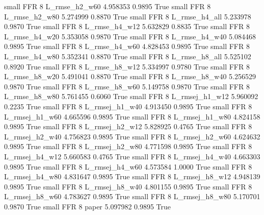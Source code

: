      small      FFR                 8  L_rmse_h2_w60   4.958353      0.9895    True
     small      FFR                 8  L_rmse_h2_w80   5.274999      0.8870    True
     small      FFR                 8  L_rmse_h4_all   5.233978      0.9870    True
     small      FFR                 8  L_rmse_h4_w12   5.632829      0.8835    True
     small      FFR                 8  L_rmse_h4_w20   5.353058      0.9870    True
     small      FFR                 8  L_rmse_h4_w40   5.084468      0.9895    True
     small      FFR                 8  L_rmse_h4_w60   4.828453      0.9895    True
     small      FFR                 8  L_rmse_h4_w80   5.352341      0.8870    True
     small      FFR                 8  L_rmse_h8_all   5.525102      0.8920    True
     small      FFR                 8  L_rmse_h8_w12   5.334997      0.9780    True
     small      FFR                 8  L_rmse_h8_w20   5.491041      0.8870    True
     small      FFR                 8  L_rmse_h8_w40   5.256529      0.9870    True
     small      FFR                 8  L_rmse_h8_w60   5.149758      0.9870    True
     small      FFR                 8  L_rmse_h8_w80   5.761455      0.6060    True
     small      FFR                 8 L_rmsej_h1_w12   5.960092      0.2235    True
     small      FFR                 8 L_rmsej_h1_w40   4.913450      0.9895    True
     small      FFR                 8 L_rmsej_h1_w60   4.665596      0.9895    True
     small      FFR                 8 L_rmsej_h1_w80   4.824158      0.9895    True
     small      FFR                 8 L_rmsej_h2_w12   5.828925      0.4765    True
     small      FFR                 8 L_rmsej_h2_w40   4.756823      0.9895    True
     small      FFR                 8 L_rmsej_h2_w60   4.624632      0.9895    True
     small      FFR                 8 L_rmsej_h2_w80   4.771598      0.9895    True
     small      FFR                 8 L_rmsej_h4_w12   5.660583      0.4765    True
     small      FFR                 8 L_rmsej_h4_w40   4.663303      0.9895    True
     small      FFR                 8 L_rmsej_h4_w60   4.573584      1.0000    True
     small      FFR                 8 L_rmsej_h4_w80   4.831647      0.9895    True
     small      FFR                 8 L_rmsej_h8_w12   4.948139      0.9895    True
     small      FFR                 8 L_rmsej_h8_w40   4.801155      0.9895    True
     small      FFR                 8 L_rmsej_h8_w60   4.783627      0.9895    True
     small      FFR                 8 L_rmsej_h8_w80   5.170701      0.9870    True
     small      FFR                 8          paper   5.097982      0.9895    True
